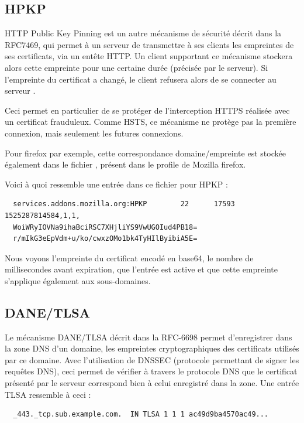 \subsection{HPKP}

HTTP Public Key Pinning est un autre mécanisme de sécurité décrit dans la RFC7469, qui permet à un serveur de transmettre à ses clients les empreintes de ses certificats, via un entête HTTP. Un client supportant ce mécanisme stockera alors cette empreinte pour une certaine durée (précisée par le serveur). Si l'empreinte du certificat a changé, le client refusera alors de se connecter au serveur \cite{hpkp}.

Ceci permet en particulier de se protéger de l'interception HTTPS réalisée avec un certificat frauduleux. Comme HSTS, ce mécanisme ne protège pas la première connexion, mais seulement les futures connexions.

Pour firefox par exemple, cette correspondance domaine/empreinte est stockée également dans le fichier , présent dans le profile de Mozilla firefox.

Voici à quoi ressemble une entrée dans ce fichier pour HPKP :

\begin{verbatim}
  services.addons.mozilla.org:HPKP        22      17593   1525287814584,1,1,
  WoiWRyIOVNa9ihaBciRSC7XHjliYS9VwUGOIud4PB18=
  r/mIkG3eEpVdm+u/ko/cwxzOMo1bk4TyHIlByibiA5E=
\end{verbatim}

Nous voyons l'empreinte du certificat encodé en base64, le nombre de millisecondes avant expiration, que l'entrée est active et que cette empreinte s'applique également aux sous-domaines.

\subsection{DANE/TLSA}

Le mécanisme DANE/TLSA décrit dans la RFC-6698 permet d'enregistrer dans la zone DNS d'un domaine, les empreintes cryptographiques des certificats utilisés par ce domaine. Avec l'utilisation de DNSSEC (protocole permettant de signer les requêtes DNS), ceci permet de vérifier à travers le protocole DNS que le certificat présenté par le serveur correspond bien à celui enregistré dans la zone. Une entrée TLSA ressemble à ceci :

\begin{verbatim}
  _443._tcp.sub.example.com.  IN TLSA 1 1 1 ac49d9ba4570ac49...
\end{verbatim}


